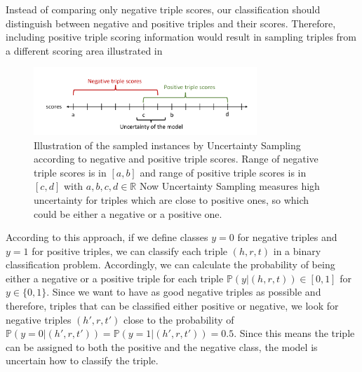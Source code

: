 Instead of comparing only negative triple scores, our classification should distinguish between negative and positive triples and their scores.
Therefore, including positive triple scoring information would result in sampling triples from a different scoring area illustrated in 
\begin{figure}[t]
  \centering
    \includegraphics[width=0.75\textwidth]{figures/positiveVsNegativeApproach.pdf}
  \caption{Illustration of the sampled instances by Uncertainty Sampling according to negative and positive triple scores.
  Range of negative triple scores is in $[a, b]$ and range of positive triple scores is in  $[c, d]$ with $a,b,c,d \in \mathbb{R}$
  Now Uncertainty Sampling measures high uncertainty for triples which are close to positive ones, so which could be either a negative or a positive one.}
  \label{fig:positiveVsNegativeApproach}
\end{figure}
According to this approach, if we define classes $y = 0$  for negative triples and $y = 1$ for positive triples, we can classify each triple $(h,r,t)$ in a binary classification problem.
Accordingly, we can calculate the probability of being either a negative or a positive triple for each triple $\mathbb{P}(y| (h,r,t)) \in [0,1]$ for $y \in \{0,1\}$.
Since we want to have as good negative triples as possible and therefore, triples that can be classified either positive or negative, we look for negative triples $(h',r,t')$ close to the probability of $\mathbb{P}(y = 0| (h',r,t')) = \mathbb{P}(y = 1| (h',r,t')) = 0.5$.
Since this means the triple can be assigned to both the positive and the negative class, the model is uncertain how to classify the triple.




